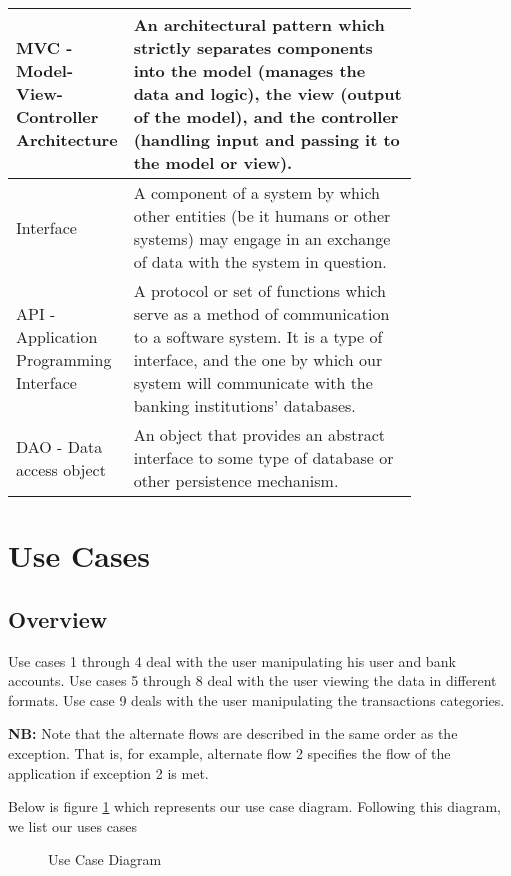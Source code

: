 \documentclass[11pt]{article}
\newcounter{use case ID}
\begin{document}
\begin{table}[H]
\begin{center}
{\begin{tabular}{|l|p{0.8\linewidth}|}
                \hline
                MVC - Model-View-Controller Architecture & An architectural pattern which strictly separates components into the model (manages the data and logic), the view (output of the model), and the controller (handling input and passing it to the model or view).\\
                \hline
                Interface & A component of a system by which other entities (be it humans or other systems) may engage in an exchange of data with the system in question. \\
                \hline
                API - Application Programming Interface & A protocol or set of functions which serve as a method of communication to a software system. It is a type of interface, and the one by which our system will communicate with the banking institutions' databases. \\
                \hline
                DAO - Data access object & An object that provides an abstract interface to some type of database or other persistence mechanism.\\
                \hline

            \end{tabular}}
    \end{center}
\end{table}

\clearpage


\section{Use Cases}
\subsection{Overview}
Use cases 1 through 4 deal with the user manipulating his user  and bank accounts. Use cases 5 through 8 deal with the user viewing the data in different formats. Use case 9 deals with the user manipulating the transactions categories.

\textbf{NB:} Note that the alternate flows are described in the same order as the exception. That is, for example, alternate flow 2 specifies the flow of the application if exception 2 is met.


Below is figure \ref{fig:use-case-diagram} which represents our use case diagram. Following this diagram, we list our uses cases

\begin{figure}[htbp]
    \caption{Use Case Diagram}
    \label{fig:use-case-diagram}
\end{figure}
\end{document}
